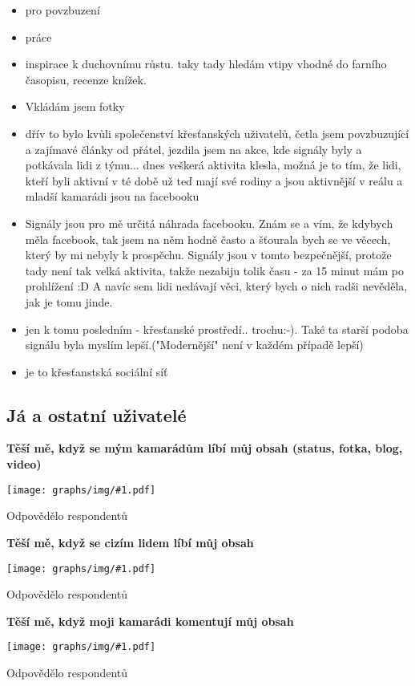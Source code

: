 \documentclass[12pt, a4paper, twoside]{article}
\newcommand{\answercount}[1]{Odpovědělo  respondentů}
\newcommand{\includegraph}[1]{
  \texttt{[image: graphs/img/\#1.pdf]}

  \answercount{#1}
}
\begin{document}
\begin{itemize}
\item pro povzbuzení

\item práce

\item inspirace k duchovnímu růstu. taky tady hledám vtipy vhodné do farního časopisu, recenze knížek.

\item Vkládám jsem fotky

\item dřív to bylo kvůli společenství křesťanských uživatelů, četla jsem povzbuzující a zajímavé články od přátel, jezdila jsem na akce, kde signály byly a potkávala lidi z týmu... dnes veškerá aktivita klesla, možná je to tím, že lidi, kteří byli aktivní v té době už teď mají své rodiny a jsou aktivnější v reálu a mladší kamarádi jsou na facebooku

\item Signály jsou pro mě určitá náhrada facebooku. Znám se a vím, že kdybych měla facebook, tak jsem na něm hodně často a šťourala bych se ve věcech, který by mi nebyly k prospěchu. Signály jsou v tomto bezpečnější, protože tady není tak velká aktivita, takže nezabiju tolik času - za 15 minut mám po prohlížení :D A navíc sem lidi nedávají věci, který bych o nich radši nevěděla, jak je tomu jinde.

\item jen k tomu posledním - křesťanské prostředí..  trochu:-). Také ta starší podoba signálu byla myslím lepší.("Modernější" není v každém případě lepší)

\item je to křesťanstská sociální síť
\end{itemize}

\subsection{Já a ostatní uživatelé}\label{sec:ostatniuzivatele}

\textbf{Těší mě, když se mým kamarádům líbí můj obsah (status, fotka, blog, video)}

\includegraph{ostatni_tesi_me_libi_se_kamaradi}

\textbf{Těší mě, když se cizím lidem líbí můj obsah}

\includegraph{ostatni_tesi_me_libi_se_cizi}

\textbf{Těší mě, když moji kamarádi komentují můj obsah}

\includegraph{ostatni_tesi_me_komentar_kamaradi}
\end{document}
